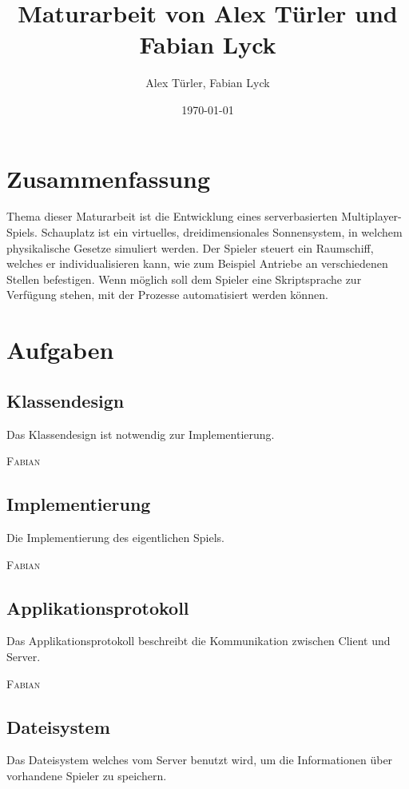 \documentclass[a4paper]{article}
\title {Maturarbeit von Alex Türler und Fabian Lyck}
\author {Alex Türler, Fabian Lyck}
\date {\today}
\begin{document}
\newcommand{\name}[1]{\textsc{#1}}
\renewcommand{\labelenumi}{\arabic{enumi}.}
\renewcommand{\labelenumii}{\arabic{enumi}.\arabic{enumii}}

\maketitle
\section{Zusammenfassung}
Thema dieser Maturarbeit ist die Entwicklung eines serverbasierten Multiplayer-Spiels. Schauplatz ist ein virtuelles, dreidimensionales Sonnensystem, in welchem physikalische Gesetze simuliert werden. Der Spieler steuert ein Raumschiff, welches er individualisieren kann, wie zum Beispiel Antriebe an verschiedenen Stellen befestigen. Wenn möglich soll dem Spieler eine Skriptsprache zur Verfügung stehen, mit der Prozesse automatisiert werden können.
\section{Aufgaben}
\subsection{Klassendesign}
Das Klassendesign ist notwendig zur Implementierung.


\name{Fabian}

\subsection{Implementierung}

Die Implementierung des eigentlichen Spiels.

\name{Fabian}

\subsection{Applikationsprotokoll}

Das Applikationsprotokoll beschreibt die Kommunikation zwischen Client und Server.

\name{Fabian}

\subsection{Dateisystem}

Das Dateisystem welches vom Server benutzt wird, um die Informationen über vorhandene Spieler zu speichern.
\end{document}
